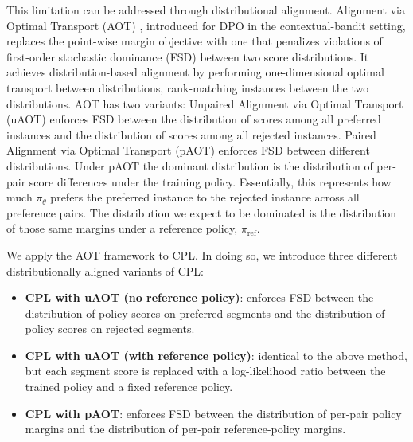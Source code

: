 \documentclass[11pt]{article}
\begin{document}
This limitation can be addressed through distributional alignment. Alignment via Optimal Transport (AOT) \cite{melnyk2024aot}, introduced for DPO in the contextual-bandit setting, replaces the point-wise margin objective with one that penalizes violations of first-order stochastic dominance (FSD) between two score distributions. It achieves distribution-based alignment by performing one-dimensional optimal transport between distributions, rank-matching instances between the two distributions. AOT has two variants: Unpaired Alignment via Optimal Transport (uAOT) enforces FSD between the distribution of scores among all preferred instances and the distribution of scores among all rejected instances. Paired Alignment via Optimal Transport (pAOT) enforces FSD between different distributions. Under pAOT the dominant distribution is the distribution of per-pair score differences under the training policy. Essentially, this represents how much $\pi_\theta$ prefers the preferred instance to the rejected instance across all preference pairs. The distribution we expect to be dominated is the distribution of those same margins under a reference policy, $\pi_\text{ref}$.

We apply the AOT framework to CPL. In doing so, we introduce three different distributionally aligned variants of CPL:

\begin{itemize}
    \item \textbf{CPL with uAOT (no reference policy)}: enforces FSD between the distribution of policy scores on preferred segments and the distribution of policy scores on rejected segments.
    \item \textbf{CPL with uAOT (with reference policy)}: identical to the above method, but each segment score is replaced with a log-likelihood ratio between the trained policy and a fixed reference policy.
    \item \textbf{CPL with pAOT}: enforces FSD between the distribution of per-pair policy margins and the distribution of per-pair reference-policy margins.
\end{itemize}
\end{document}
